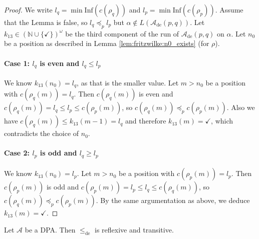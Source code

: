 \begin{proof}
	We write $l_q = \min \text{Inf}(c(\rho_q))$ and $l_p = \min \text{Inf}(c(\rho_p))$. Assume that the Lemma is false, so $l_q \preceq_p l_p$ but $\alpha \notin L(\mathcal{A}_\text{de}(p, q))$. Let $k_{13} \in (\mathbb{N} \cup \{\checkmark\})^\omega$ be the third component of the run of $\mathcal{A}_\text{de}(p, q)$ on $\alpha$. Let $n_0$ be a position as described in Lemma \ref{lem:fritzwilke:n0_exists} (for $\rho$). 
	
	\paragraph{Case 1: $l_q$ is even and $l_q \leq l_p$} We know $k_{13}(n_0) = l_q$, as that is the smaller value. Let $m > n_0$ be a position with $c(\rho_q(m)) = l_q$. Then $c(\rho_q(m))$ is even and $c(\rho_q(m)) = l_q \leq l_p \leq c(\rho_p(m))$, so $c(\rho_q(m)) \preceq_p c(\rho_p(m))$. Also we have $c(\rho_q(m)) \leq k_{13}(m-1) = l_q$ and therefore $k_{13}(m) = \checkmark$, which contradicts the choice of $n_0$.
	
	\paragraph{Case 2: $l_p$ is odd and $l_q \geq l_p$} We know $k_{13}(n_0) = l_p$. Let $m > n_0$ be a position with $c(\rho_p(m)) = l_p$. Then $c(\rho_p(m))$ is odd and $c(\rho_p(m)) = l_p \leq l_q \leq c(\rho_q(m))$, so $c(\rho_q(m)) \preceq_p c(\rho_p(m))$. By the same argumentation as above, we deduce $k_{13}(m) = \checkmark$.
\end{proof}

\begin{lem}
\label{lem:fritzwilke:de_order_reftran}
	Let $\mathcal{A}$ be a DPA. Then $\leq_\text{de}$ is reflexive and transitive.
\end{lem}


